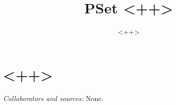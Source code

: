 \documentclass[11pt]{scrartcl}
\title{PSet <++>}
\subtitle{<++>}
\begin{document}
\maketitle

\section{<++>}
\begin{prob}
\end{prob} 
\emph{Collaborators and sources:} None. 
\newpage
\end{document}
